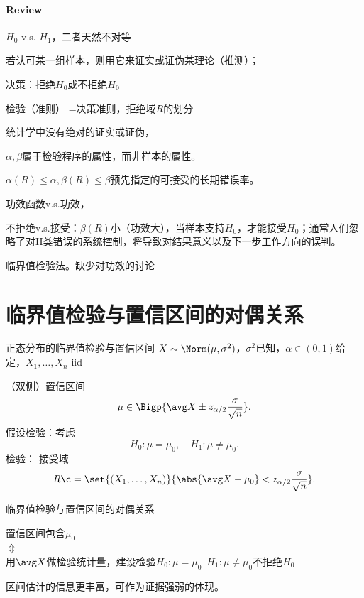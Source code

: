 \paragraph{Review}
\begin{compactenum}
	\item $H_0$ v.s. $H_1$，二者天然不对等
	
	若认可某一组样本，则用它来证实或证伪某理论（推测）；
	\item 决策：拒绝$H_0$或不拒绝$H_0$
	
	检验（准则） =决策准则，拒绝域$R$的划分
	\item 统计学中没有绝对的证实或证伪，
	
	$\alpha,\beta$属于检验程序的属性，而非样本的属性。
	
	$\alpha(R)\leqslant\alpha,\beta(R)\leqslant\beta$预先指定的可接受的长期错误率。
	\item 功效函数v.s.功效，
	
	不拒绝v.s.接受：$\beta(R)$小（功效大），当样本支持$H_0$，才能接受$H_0$；通常人们忽略了对II类错误的系统控制，将导致对结果意义以及下一步工作方向的误判。
	\item 临界值检验法。缺少对功效的讨论
\end{compactenum}
\section{临界值检验与置信区间的对偶关系}
\begin{example}{正态分布的临界值检验与置信区间}{}
	$X\sim\Norm(\mu,\sigma^2)$，$\sigma^2$已知，$\alpha\in(0,1)$给定，$X_1,\ldots,X_n$ iid 

	（双侧）置信区间
	\[
		\mu\in\Bigp{\avg X\pm z_{\alpha/2}\frac\sigma{\sqrt n}}.
	\]
	假设检验：考虑
	\[
		H_0:\mu=\mu_0,\quad H_1:\mu\neq\mu_0.
	\]
	检验：%
	接受域
	\[
		R\c=\set{(X_1,\ldots,X_n)}{\abs{\avg X-\mu_0}<z_{\alpha/2}\frac\sigma{\sqrt n}}.
	\]
\end{example}
\begin{theorem}{临界值检验与置信区间的对偶关系}{}
	\begin{center}
		置信区间包含$\mu_0$\\
		$\Updownarrow$\\
		用$\avg X$做检验统计量，建设检验$H_0:\mu=\mu_0\enspace H_1:\mu\neq\mu_0$不拒绝$H_0$
	\end{center}
\end{theorem}
\begin{remark}
	区间估计的信息更丰富，可作为证据强弱的体现。
\end{remark}

